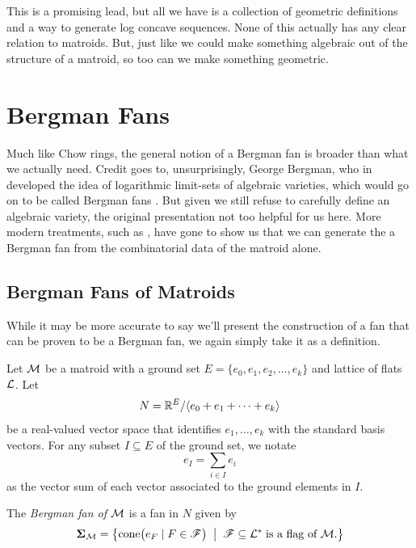 \documentclass[12pt,oneside]{../../sfsuthesis}
\begin{document}
This is a promising lead, but all we have is a collection of geometric definitions and a way to generate log concave sequences.
None of this actually has any clear relation to matroids.
But, just like we could make something algebraic out of the structure of a matroid, so too can we make something geometric.

\section{Bergman Fans}
Much like Chow rings, the general notion of a Bergman fan is broader than what we actually need.
Credit goes to, unsurprisingly, George Bergman, who in \cite{bergmanLogarithmicLimitsetAlgebraic1971} developed the idea of logarithmic limit-sets of algebraic varieties, which would go on to be called Bergman fans \cite{feichtnerMatroidPolytopesNested2005}.
But given we still refuse to carefully define an algebraic variety, the original presentation not too helpful for us here.
More modern treatments, such as \cite{ardilaBergmanComplexMatroid2006,huhLogconcavityCharacteristicPolynomials2012}, have gone to show us that we can generate the a Bergman fan from the combinatorial data of the matroid alone.

\subsection{Bergman Fans of Matroids}
While it may be more accurate to say we'll present the construction of a fan that can be proven to be a Bergman fan, we again simply take it as a definition.

\begin{definition}\th\label{def:bergmanFan}
    Let \( \mathcal{M} \) be a matroid with a ground set \( E = \{ e_0, e_1, e_2, \dots, e_k \} \) and lattice of flats \( \mathcal{L} \).
    Let
    \[
        N = \mathbb{R}^{E}/\langle e_0 + e_1 + \cdots + e_k \rangle
    \]
    be a real-valued vector space that identifies \( e_1, \dots, e_k \) with the standard basis vectors.
    For any subset \( I \subseteq E \) of the ground set, we notate
    \[
        e_I = \sum_{i \in I} e_i
    \]
    as the vector sum of each vector associated to the ground elements in \( I \).

    The \emph{Bergman fan of \( \mathcal{M} \)} is a fan in \( N \) given by
    \[
        \bm{\Sigma}_{\mathcal{M}} = \left\{
        \mathrm{cone}\big( e_F \; | \; F \in \mathscr{F} \big)
        \;\; \middle| \;\;
        \mathscr{F} \subseteq \mathcal{L}^\ast \; \text{is a flag of \(\mathcal{M}\)}.
        \right\}
    \]
\end{definition}
\end{document}
